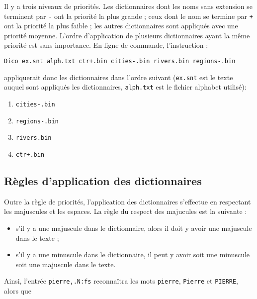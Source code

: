 
\bigskip
\noindent Il y a trois niveaux de priorités. Les dictionnaires dont les noms sans extension se
terminent par \verb+-+\index{\verbc{-}}\index{\verbc{+}} ont la priorité la plus grande ; ceux dont
le nom se termine par \verb-+- ont la priorité la plus faible ; les autres dictionnaires sont
appliqués avec une priorité moyenne. L’ordre d’application de plusieurs dictionnaires ayant la même
priorité est sans importance. En ligne de commande, l’instruction :


\bigskip
\noindent
\verb$Dico ex.snt alph.txt ctr+.bin cities-.bin rivers.bin regions-.bin$

\bigskip \noindent appliquerait donc les dictionnaires dans l’ordre suivant (\verb+ex.snt+ est le
texte auquel sont appliqués les dictionnaires, \verb+alph.txt+ est le fichier alphabet utilisé):

\begin{enumerate}
  \item \verb$cities-.bin$
  \item \verb$regions-.bin$
  \item \verb$rivers.bin$
  \item \verb$ctr+.bin$
\end{enumerate}

\subsection{Règles d’application des dictionnaires}
\label{section-transducer-application-rules}

Outre la règle de priorités, l’application des dictionnaires s’effectue en respectant les
majuscules et les espaces. La règle du respect des majucules est la suivante :


\begin{itemize}
  \item s’il y a une majuscule dans le dictionnaire, alors il doit y avoir une majuscule dans le
texte ;

  \item s’il y a une minuscule dans le dictionnaire, il peut y avoir soit une minuscule soit une
majuscule dans le texte.

\end{itemize}

\noindent Ainsi, l’entrée \verb$pierre,.N:fs$ reconnaîtra les mots \verb+pierre+,
\verb+Pierre+ et \verb+PIERRE+, alors que

